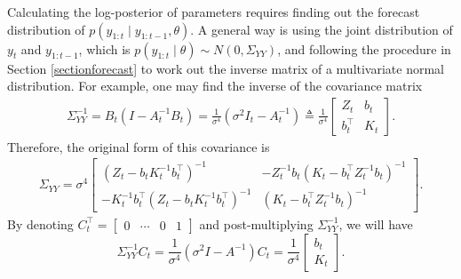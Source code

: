 Calculating the log-posterior of parameters requires finding out the forecast distribution of $p(y_{1:t}\mid y_{1:t-1},\theta)$. A general way is using the joint distribution of $y_{t}$ and $y_{1:t-1}$, which is $p(y_{1:t}\mid \theta)\sim N(0,\Sigma_{YY})$, and following the procedure in Section \ref{sectionforecast} to work out the inverse matrix of a multivariate normal distribution. For example, one may find the inverse of the covariance matrix 
\begin{align*}
\Sigma_{YY}^{-1} = B_t(I-A_t^{-1}B_t) =\frac{1}{\sigma^4}(\sigma^2 I_t-A_t^{-1}) \triangleq \frac{1}{\sigma^4} 
\begin{bmatrix} 
Z_{t} & b_{t} \\
b_{t}^\top & K_{t}
\end{bmatrix}.
\end{align*}
Therefore, the original form of this covariance is 
\begin{align*} \Sigma_{YY} =\sigma^4 \begin{bmatrix}
\left(Z_t-b_tK_t^{-1}b_t^\top\right)^{-1} & -Z_t^{-1}b_t\left(K_t-b_t^\top Z_t^{-1}b_t\right)^{-1}\\
-K_t^{-1}b_t^\top \left(Z_t-b_tK_t^{-1}b_t^\top\right)^{-1} & \left(K_t-b_t^\top Z_t^{-1}b_t\right)^{-1}
\end{bmatrix}. 
\end{align*}
By denoting $C_{t}^\top = \begin{bmatrix} 0 & \cdots & 0 & 1\end{bmatrix}$ and post-multiplying $\Sigma_{YY}^{-1}$, we will have  
\begin{equation}\label{beforeSMformula}
\Sigma_{YY}^{-1} C_{t}= \frac{1}{\sigma^4}\left(\sigma^2 I-A^{-1} \right)C_{t}= \frac{1}{\sigma^4} \begin{bmatrix} b_{t} \\ K_{t} \end{bmatrix}.
\end{equation} 


